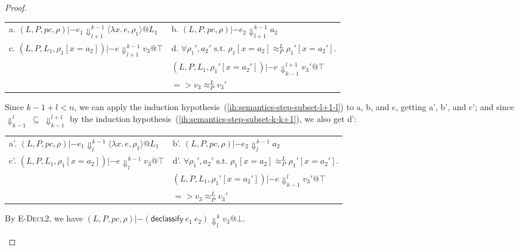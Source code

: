 \documentclass{article}
\makeatletter
\theoremstyle{definition}
\newcommand{\at}{\ensuremath{{\scriptstyle{@}}}}
\newcommand{\pc}{\ensuremath{{\mathit{pc}}}}
\makeatother
\begin{document}
\begin{proof}
\begin{enumerate}
\begin{itemize}
\begin{center}
\begin{tabular*}{1.0\linewidth}{ll}
          a.
          $(L, P, \pc, \rho) |- e_1
          \Downarrow^{k-1}_{l+1}
          \langle{\lambda{x}.\, e, \rho_1\rangle} \at L_1$
          &
          b.
          $(L, P, \pc, \rho) |- e_2
          \Downarrow^{k-1}_{l+1}
          a_2$
          \\[1.8ex]
          c.
          $(L, P, L_1, \rho_1[x = a_2]) |- e
          \Downarrow^{k-1}_{l+1}
          v_3 \at \top$
          &
          d.
          $\forall{\rho_1', a_2' \text{ s.t. }
            \rho_1[x = a_2] \approx^{L}_{P} \rho_1'[x = a_2']}.$
          \\ & \quad\quad
          $(L, P, L_1, \rho_1'[x = a_2']) |- e
          \Downarrow^{l+1}_{k-1} v_3' \at \top$
          \\ & \quad\quad
          $=> v_3 \approx^{L}_{P} v_3'$
        \end{tabular*}
      \end{center}
      Since $k-1 + l < n$, we can apply the induction
      hypothesis~(\ref{ih:semantics-step-subset-l+1-l}) to a, b, and c,
      getting a', b', and c'; and since
      $\Downarrow^{l}_{k-1}\ \subseteq\ \Downarrow^{l+1}_{k-1}$
      by the induction hypothesis~(\ref{ih:semantics-step-subset-k-k+1}),
      we also get d':
      \begin{center}
        \begin{tabular*}{1.0\linewidth}{ll}
          a'.
          $(L, P, \pc, \rho) |- e_1
          \Downarrow^{k-1}_{l}
          \langle{\lambda{x}.\, e, \rho_1\rangle} \at L_1$
          &
          b'.
          $(L, P, \pc, \rho) |- e_2
          \Downarrow^{k-1}_{l}
          a_2$
          \\[1.8ex]
          c'.
          $(L, P, L_1, \rho_1[x = a_2]) |- e
          \Downarrow^{k-1}_{l}
          v_3 \at \top$
          &
          d'.
          $\forall{\rho_1', a_2' \text{ s.t. }
            \rho_1[x = a_2] \approx^{L}_{P} \rho_1'[x = a_2']}.$
          \\ & \quad\quad
          $(L, P, L_1, \rho_1'[x = a_2']) |- e
          \Downarrow^{l}_{k-1} v_3' \at \top$
          \\ & \quad\quad
          $=> v_3 \approx^{L}_{P} v_3'$
        \end{tabular*}
      \end{center}
      By \textsc{E-Decl2}, we have
      $(L, P, \pc, \rho) |- (\mathsf{declassify}\ e_1\ e_2)
      \Downarrow^{k}_{l}
      v_3 \at \bot$.
      \qedhere
    \end{itemize}
  \end{enumerate}
\end{proof}
\end{document}
